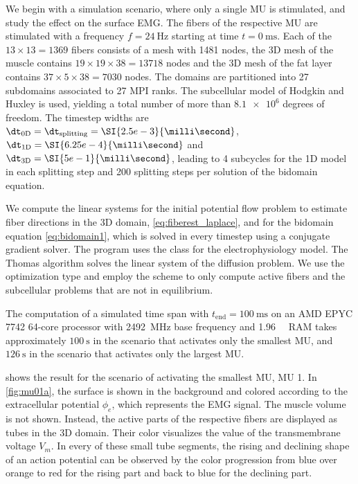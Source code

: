 We begin with a simulation scenario, where only a single MU is stimulated, and study the effect on the surface EMG. The fibers of the respective MU are stimulated with a frequency $f=\SI{24}{\hertz}$ starting at time $t=\SI{0}{\milli\second}$. 
Each of the $13\times 13=\num{1369}$ fibers consists of a mesh with 1481 nodes, the 3D mesh of the muscle contains $19 \times 19 \times 38 = \num{13718}$ nodes and the 3D mesh of the fat layer contains $37 \times 5 \times 38 = \num{7030}$ nodes. The domains are partitioned into 27 subdomains associated to 27 MPI ranks. The subcellular model of Hodgkin and Huxley is used, yielding a total number of more than $\num{8.1e6}$ degrees of freedom. 
The timestep widths are $\dt_\text{0D}=\dt_\text{splitting} = \SI{2.5e-3}{\milli\second}$, $\dt_\text{1D} = \SI{6.25e-4}{\milli\second}$ and $\dt_\text{3D} = \SI{5e-1}{\milli\second}$, leading to 4 subcycles for the 1D model in each splitting step and 200 splitting steps per solution of the bidomain equation.

We compute the linear systems for the initial potential flow problem to estimate fiber directions in the 3D domain, \cref{eq:fiberest_laplace}, and for the bidomain equation \cref{eq:bidomain1}, which is solved in every timestep  using a conjugate gradient solver. 
The program uses the  class for the electrophysiology model. The Thomas algorithm solves the linear system of the diffusion problem. We use the  optimization type and employ the scheme to only compute active fibers and the subcellular problems that are not in equilibrium.

The computation of a simulated time span with $t_\text{end}=\SI{100}{\milli\second}$  on an AMD EPYC 7742 64-core processor with \SI{2492}{\mega\hertz} base frequency and \SI{1.96}{\tera\byte} RAM takes approximately $\SI{100}{\second}$ in the scenario that activates only the smallest MU, and $\SI{126}{\second}$ in the scenario that activates only the largest MU.

 shows the result for the scenario of activating the smallest MU, MU 1. In \cref{fig:mu01a}, the surface is shown in the background and colored according to the extracellular potential $\phi_e$, which represents the EMG signal. The muscle volume is not shown. Instead, the active parts of the respective fibers are displayed as tubes in the 3D domain. Their color visualizes the value of the transmembrane voltage $V_m$. In every of these small tube segments, the rising and declining shape of an action potential can be observed by the color progression from blue over orange to red for the rising part and back to blue for the declining part.


